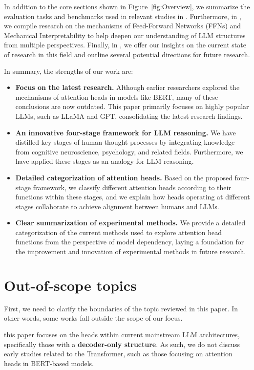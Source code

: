 \documentclass[12pt,letterpaper]{article}
\begin{document}
In addition to the core sections shown in Figure~\ref{fig:Overview}, we summarize the evaluation tasks and benchmarks used in relevant studies in .
Furthermore, in , we compile research on the mechanisms of Feed-Forward Networks (FFNs) and Mechanical Interpretability to help deepen our understanding of LLM structures from multiple perspectives.
Finally, in , we offer our insights on the current state of research in this field and outline several potential directions for future research.

In summary, the strengths of our work are:
\begin{itemize}
    \item \textbf{Focus on the latest research.} Although earlier researchers explored the mechanisms of attention heads in models like BERT, many of these conclusions are now outdated. This paper primarily focuses on highly popular LLMs, such as LLaMA and GPT, consolidating the latest research findings.
    \item \textbf{An innovative four-stage framework for LLM reasoning.} We have distilled key stages of human thought processes by integrating knowledge from cognitive neuroscience, psychology, and related fields. Furthermore, we have applied these stages as an analogy for LLM reasoning.
    \item \textbf{Detailed categorization of attention heads.} Based on the proposed four-stage framework, we classify different attention heads according to their functions within these stages, and we explain how heads operating at different stages collaborate to achieve alignment between humans and LLMs.
    \item \textbf{Clear summarization of experimental methods.} We provide a detailed categorization of the current methods used to explore attention head functions from the perspective of model dependency, laying a foundation for the improvement and innovation of experimental methods in future research.
\end{itemize}

\section*{Out-of-scope topics} \label{sec:out_of_scope}
First, we need to clarify the boundaries of the topic reviewed in this paper. In other words, some works fall outside the scope of our focus.

 this paper focuses on the heads within current mainstream LLM architectures, specifically those with a \textbf{decoder-only structure}. As such, we do not discuss early studies related to the Transformer, such as those focusing on attention heads in BERT-based models.\citep{BertInterp_19_ACL,BertMarkov_19_ACL,BertAnalysis_21_AAAI_India}
\end{document}
